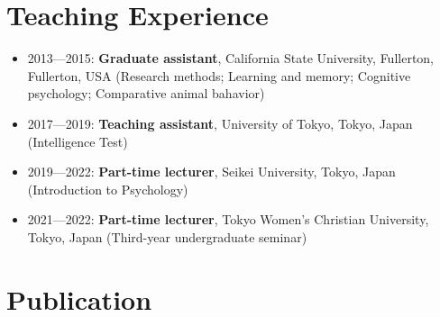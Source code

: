 \documentclass[a4paper]{article}
\begin{document}
\section{Teaching Experience}
\begin{itemize}
	\item 2013---2015: \textbf{Graduate assistant}, California State University, Fullerton, Fullerton, USA (Research methods; Learning and memory; Cognitive psychology; Comparative animal bahavior)
	\item 2017---2019: \textbf{Teaching assistant}, University of Tokyo, Tokyo, Japan (Intelligence Test)
	\item 2019---2022: \textbf{Part-time lecturer}, Seikei University, Tokyo, Japan (Introduction to Psychology)
	\item 2021---2022: \textbf{Part-time lecturer}, Tokyo Women's Christian University, Tokyo, Japan (Third-year undergraduate seminar)
\end{itemize}

\section{Publication}
\end{document}
